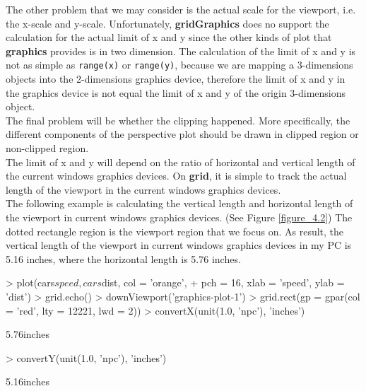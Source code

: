 \documentclass{report}
\begin{document}
The other problem that we may consider is the actual scale for the viewport, i.e. the x-scale and y-scale. Unfortunately, \textbf{gridGraphics} does no support the calculation for the actual limit of x and y since the other kinds of plot that \textbf{graphics} provides is in two dimension. The calculation of the limit of x and y is not as simple as \texttt{range(x)} or \texttt{range(y)}, because we are mapping a 3-dimensions objects into the 2-dimensions graphics device, therefore the limit of x and y in the graphics device is not equal the limit of x and y of the origin 3-dimensions object.\\

The final problem will be whether the clipping happened. More specifically, the different components of the perspective plot should be drawn in clipped region or non-clipped region.\\

The limit of x and y will depend on the ratio of horizontal and vertical length of the current windows graphics devices. On \textbf{grid}, it is simple to track the actual length of the viewport in the current windows graphics devices. \\

The following example is calculating the vertical length and horizontal length of the viewport in current windows graphics devices. (See Figure \ref{figure_4.2}) The dotted rectangle region is the viewport region that we focus on. As result, the vertical length of the viewport in current windows graphics devices in my PC is 5.16 inches, where the horizontal length is 5.76 inches. \\
\begin{Schunk}
\begin{Sinput}
> plot(cars$speed, cars$dist, col = 'orange', 
+       pch = 16, xlab = 'speed', ylab = 'dist')
> grid.echo()
> downViewport('graphics-plot-1')
> grid.rect(gp = gpar(col = 'red', lty = 12221, lwd = 2))
> convertX(unit(1.0, 'npc'), 'inches')
\end{Sinput}
\begin{Soutput}
[1] 5.76inches
\end{Soutput}
\begin{Sinput}
> convertY(unit(1.0, 'npc'), 'inches')
\end{Sinput}
\begin{Soutput}
[1] 5.16inches
\end{Soutput}
\end{Schunk}
\end{document}
